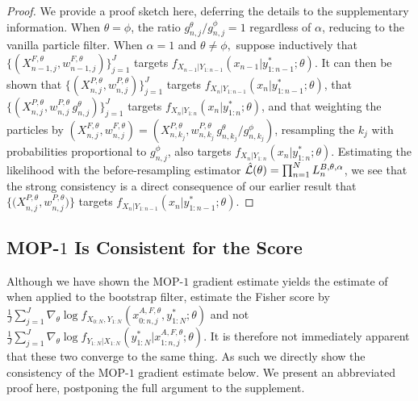 \documentclass[9pt,twocolumn,pnasresearcharticle]{pnas-new}
\newcommand\arxiv[2]{#2} %
\begin{document}

\begin{proof}
    We provide a proof sketch here, deferring the details to \arxiv{Appendix~\ref{appendix:targeting}}{the supplementary information}. 
    When $\theta=\phi$, the ratio ${g_{n,j}^\theta}/{g_{n,j}^\phi}=1$ regardless of $\alpha$, reducing to the vanilla particle filter.
    When $\alpha=1$ and $\theta\neq\phi,$ suppose inductively that $\{(X^{F,\theta}_{n-1,j},w^{F,\theta}_{n-1,j})\}_{j=1}^J$ targets $f_{X_{n-1}|Y_{1:n-1}}(x_{n-1}|y^*_{1:n-1};\theta)$.
    It can then be shown that $\{(X^{P,\theta}_{n,j},w^{P,\theta}_{n,j})\}_{j=1}^J$ targets $f_{X_{n}|Y_{1:n-1}}(x_{n}|y^*_{1:n-1};\theta)$, that $\{(X^{P,\theta}_{n,j},w^{P,\theta}_{n,j} \, g^\theta_{n,j} )\}_{j=1}^J$ targets  $f_{X_{n}|Y_{1:n}}(x_{n}|y^*_{1:n};\theta)$, and that weighting the particles by $(X^{F,\theta}_{n,j},w^{F,\theta}_{n,j}) = (X^{P,\theta}_{n,k_j}, w^{P,\theta}_{n,k_j} \, g^\theta_{n,k_j} \big/ g^\phi_{n,k_j})$,
    resampling the $k_j$ with probabilities proportional to $g^\phi_{n,j}$, also targets $f_{X_{n}|Y_{1:n}}(x_{n}|y^*_{1:n};\theta)$.
    Estimating the likelihood with the before-resampling estimator $\hat{\mathcal{L}}(\theta) = \prod_{n=1}^N L_n^{B,\theta,\alpha}$, we see that the strong consistency is a direct consequence of our earlier result that $\{ \big(X^{P,\theta}_{n,j},w^{P,\theta}_{n,j}\big) \}$ targets $f_{X_{n}|Y_{1:n-1}}(x_{n}|y^*_{1:n-1};\theta)$. 
\end{proof}

\arxiv{}{\vspace*{-2mm}}
\subsection{MOP-$1$ Is Consistent for the Score}

Although we have shown the MOP-$1$ gradient estimate yields the estimate of \cite{poyiadjis11, scibior21} when applied to the bootstrap filter, \cite{poyiadjis11, scibior21} estimate the Fisher score by 
$\frac{1}{J}\sum_{j=1}^J \nabla_\theta \log f_{X_{0:N}, Y_{1:N}}(x_{0:n,j}^{A, F,\theta}, y_{1:N}^* ; \theta)$ and not
$\frac{1}{J}\sum_{j=1}^J \nabla_\theta \log f_{Y_{1:N}| X_{1:N}}(y_{1:N}^* | x_{1:n,j}^{A, F,\theta}; \theta).$
It is therefore not immediately apparent that these two converge to the same thing. As such we directly show the consistency of the MOP-$1$ gradient estimate below. 
We present an abbreviated proof here, postponing the full argument to \arxiv{Appendix~\ref{appendix:consistency}}{the supplement}.
\end{document}
